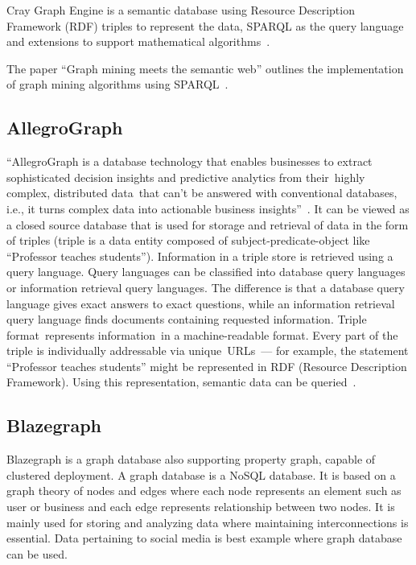 Cray Graph Engine is a semantic database using Resource Description
Framework (RDF) triples to represent the data, SPARQL as the query
language and extensions to support mathematical
algorithms~\cite{paper-graph-data}.

The paper ``Graph mining meets the semantic web'' outlines the
implementation of graph mining algorithms using
SPARQL~\cite{paper-lee2015graph}.

     \pv

\subsection{AllegroGraph}
     
``AllegroGraph is a database technology that enables businesses to
extract sophisticated decision insights and predictive analytics from
their highly complex, distributed data that can’t be answered with
conventional databases, i.e., it turns complex data into actionable
business insights''~\cite{www-Allegro}. It can be viewed as a closed
source database that is used for storage and retrieval of data in the
form of triples (triple is a data entity composed of
subject-predicate-object like ``Professor teaches students'').
Information in a triple store is retrieved using a query
language. Query languages can be classified into database query
languages or information retrieval query languages. The difference is
that a database query language gives exact answers to exact questions,
while an information retrieval query language finds documents
containing requested information.  Triple format represents
information in a machine-readable format.  Every part of the triple is
individually addressable via unique URLs — for example, the statement
``Professor teaches students'' might be represented in RDF (Resource
Description Framework). Using this representation, semantic data can
be queried~\cite{www-Allegrow}.

     \pv

\subsection{Blazegraph}

     Blazegraph is a graph database also supporting property graph, 
     capable of clustered deployment. A graph database is a NoSQL 
     database. It is based on a graph theory of nodes and edges where 
     each node represents an element such as user or business and each 
     edge represents relationship between two nodes. It is mainly used 
     for storing and analyzing data where maintaining interconnections 
     is essential. Data pertaining to social media is best example where 
     graph database can be used.

